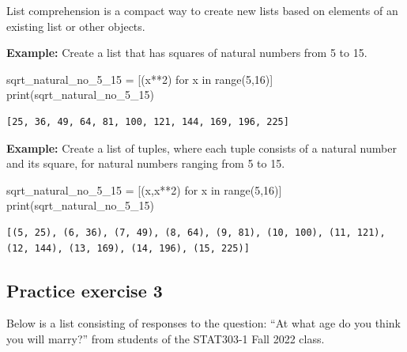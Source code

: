 \documentclass[
  letterpaper,
  DIV=11,
  numbers=noendperiod]{scrreprt}
\newenvironment{Shaded}{\begin{snugshade}}{\end{snugshade}}
\newcommand{\BuiltInTok}[1]{\textcolor[rgb]{0.00,0.23,0.31}{#1}}
\newcommand{\ControlFlowTok}[1]{\textcolor[rgb]{0.00,0.23,0.31}{#1}}
\newcommand{\DecValTok}[1]{\textcolor[rgb]{0.68,0.00,0.00}{#1}}
\newcommand{\KeywordTok}[1]{\textcolor[rgb]{0.00,0.23,0.31}{#1}}
\newcommand{\NormalTok}[1]{\textcolor[rgb]{0.00,0.23,0.31}{#1}}
\newcommand{\OperatorTok}[1]{\textcolor[rgb]{0.37,0.37,0.37}{#1}}
\begin{document}
List comprehension is a compact way to create new lists based on
elements of an existing list or other objects.

\textbf{Example:} Create a list that has squares of natural numbers from
5 to 15.

\begin{Shaded}
\begin{Highlighting}[]
\NormalTok{sqrt\_natural\_no\_5\_15 }\OperatorTok{=}\NormalTok{ [(x}\OperatorTok{**}\DecValTok{2}\NormalTok{) }\ControlFlowTok{for}\NormalTok{ x }\KeywordTok{in} \BuiltInTok{range}\NormalTok{(}\DecValTok{5}\NormalTok{,}\DecValTok{16}\NormalTok{)]}
\BuiltInTok{print}\NormalTok{(sqrt\_natural\_no\_5\_15)}
\end{Highlighting}
\end{Shaded}

\begin{verbatim}
[25, 36, 49, 64, 81, 100, 121, 144, 169, 196, 225]
\end{verbatim}

\textbf{Example:} Create a list of tuples, where each tuple consists of
a natural number and its square, for natural numbers ranging from 5 to
15.

\begin{Shaded}
\begin{Highlighting}[]
\NormalTok{sqrt\_natural\_no\_5\_15 }\OperatorTok{=}\NormalTok{ [(x,x}\OperatorTok{**}\DecValTok{2}\NormalTok{) }\ControlFlowTok{for}\NormalTok{ x }\KeywordTok{in} \BuiltInTok{range}\NormalTok{(}\DecValTok{5}\NormalTok{,}\DecValTok{16}\NormalTok{)]}
\BuiltInTok{print}\NormalTok{(sqrt\_natural\_no\_5\_15)}
\end{Highlighting}
\end{Shaded}

\begin{verbatim}
[(5, 25), (6, 36), (7, 49), (8, 64), (9, 81), (10, 100), (11, 121), (12, 144), (13, 169), (14, 196), (15, 225)]
\end{verbatim}

\hypertarget{practice-exercise-3-2}{%
\subsection{Practice exercise 3}\label{practice-exercise-3-2}}

Below is a list consisting of responses to the question: ``At what age
do you think you will marry?'' from students of the STAT303-1 Fall 2022
class.
\end{document}

